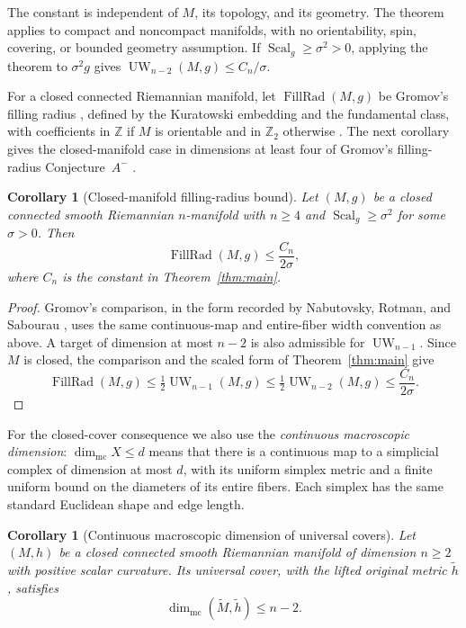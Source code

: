 \documentclass[11pt]{article}
\numberwithin{equation}{section}
\newtheorem{corollary}[theorem]{Corollary}
\theoremstyle{definition}
\theoremstyle{remark}
\begin{document}
The constant is independent of \(M\), its topology, and its geometry.
The theorem applies to compact and noncompact manifolds, with no
orientability, spin, covering, or bounded geometry assumption. If
\(\operatorname{Scal}_g\ge\sigma^2>0\), applying the theorem to \(\sigma^2g\) gives
\(\operatorname{UW}_{n-2}(M,g)\le C_n/\sigma\).

For a closed connected Riemannian manifold, let
\(\operatorname{FillRad}(M,g)\) be Gromov's filling radius
\citep{gromov1983Filling}, defined by the Kuratowski embedding and the
fundamental class, with coefficients in
\(\mathbb Z\) if \(M\) is orientable and in \(\mathbb Z_2\) otherwise
\citep[Definition~3.1]{nabutovskyRotmanSabourau2021}.
The next corollary gives the closed-manifold case in dimensions at least
four of Gromov's filling-radius Conjecture~\(A^{-}\)
\citep[\S3]{gromov2017Dozen}.

\begin{corollary}[Closed-manifold filling-radius bound]
\label{cor:filling-radius}
Let \((M,g)\) be a closed connected smooth Riemannian \(n\)-manifold
with \(n\ge4\) and \(\operatorname{Scal}_g\ge\sigma^2\) for some \(\sigma>0\). Then
\[
 \operatorname{FillRad}(M,g)\le \frac{C_n}{2\sigma},
\]
where \(C_n\) is the constant in Theorem~\ref{thm:main}.
\end{corollary}

\begin{proof}
Gromov's comparison, in the form recorded by Nabutovsky, Rotman, and
Sabourau \citep[Definition~6.1 and equation~(6.1)]{nabutovskyRotmanSabourau2021},
uses the same continuous-map and entire-fiber width convention as above.
A target of dimension at most \(n-2\) is also admissible for
\(\operatorname{UW}_{n-1}\). Since \(M\) is closed, the comparison and the scaled
form of Theorem~\ref{thm:main} give
\[
 \operatorname{FillRad}(M,g)
 \le \tfrac12\operatorname{UW}_{n-1}(M,g)
 \le \tfrac12\operatorname{UW}_{n-2}(M,g)
 \le \frac{C_n}{2\sigma}.
\]
\end{proof}

For the closed-cover consequence we also use the \emph{continuous
macroscopic dimension}: $\dim_{\mathrm{mc}}X\le d$ means that there is a
continuous map to a simplicial complex of dimension at most $d$, with its uniform simplex metric
and a finite uniform bound on the diameters of its entire fibers.
Each simplex has the same standard Euclidean shape and edge length.

\begin{corollary}[Continuous macroscopic dimension of universal covers]
\label{cover:main}
Let $(M,h)$ be a closed connected smooth Riemannian manifold of
dimension $n\ge2$ with positive scalar curvature.  Its universal cover,
with the lifted original metric $\widetilde h$, satisfies
\[
 \dim_{\mathrm{mc}}(\widetilde M,\widetilde h)\le n-2.
\]
\end{corollary}
\end{document}
